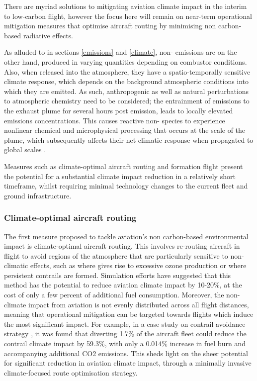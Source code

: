 There are myriad solutions to mitigating aviation climate impact in the interim to low-carbon flight, however the focus here will remain on near-term operational mitigation measures that optimise aircraft routing by minimising non carbon-based radiative effects. 

As alluded to in sections \ref{emissions} and \ref{climate}, non- emissions are on the other hand, produced in varying quantities depending on combustor conditions. Also, when released into the atmosphere, they have a spatio-temporally sensitive climate response, which depends on the background atmospheric conditions into which they are emitted. As such, anthropogenic as well as natural perturbations to atmospheric chemistry need to be considered; the entrainment of emissions to the exhaust plume for several hours post emission, leads to locally elevated emissions concentrations. This causes reactive non- species to experience nonlinear chemical and microphysical processing that occurs at the scale of the plume, which subsequently affects their net climatic response when propagated to global scales \cite{}.

Measures such as climate-optimal aircraft routing and formation flight present the potential for a substantial climate impact reduction in a relatively short timeframe, whilst requiring minimal technology changes to the current fleet and ground infrastructure.


\subsubsection{Climate-optimal aircraft routing}
The first measure proposed to tackle aviation’s non carbon-based environmental impact is climate-optimal aircraft routing. This involves re-routing aircraft in flight to avoid regions of the atmosphere that are particularly sensitive to non- climatic effects, such as where  gives rise to excessive ozone production or where persistent contrails are formed. Simulation efforts have suggested that this method has the potential to reduce aviation climate impact by 10-20\%, at the cost of only a few percent of additional fuel consumption. Moreover, the non- climate impact from aviation is not evenly distributed across all flight distances, meaning that operational mitigation can be targeted towards flights which induce the most significant impact. For example, in a case study on contrail avoidance strategy \cite{Teoh2020}, it was found that diverting 1.7\% of the aircraft fleet could reduce the contrail climate impact by 59.3\%, with only a 0.014\% increase in fuel burn and accompanying additional CO2 emissions. This sheds light on the sheer potential for significant reduction in aviation climate impact, through a minimally invasive climate-focused route optimisation strategy.

